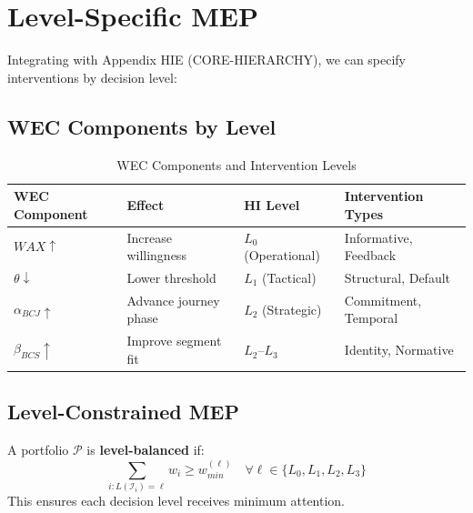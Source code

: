 \section{Level-Specific MEP}
\label{sec:mep-levels}

Integrating with Appendix HIE (CORE-HIERARCHY), we can specify interventions by
decision level:

\subsection{WEC Components by Level}

\begin{table}[htbp]
\centering
\caption{WEC Components and Intervention Levels}
\label{tab:wec-levels}
\renewcommand{\arraystretch}{1.4}
\begin{tabular}{@{}llll@{}}
\toprule
\textbf{WEC Component} & \textbf{Effect} & \textbf{HI Level} & \textbf{Intervention Types} \\
\midrule
$WAX \uparrow$ & Increase willingness & $L_0$ (Operational) & Informative, Feedback \\
$\theta \downarrow$ & Lower threshold & $L_1$ (Tactical) & Structural, Default \\
$\alpha_{BCJ} \uparrow$ & Advance journey phase & $L_2$ (Strategic) & Commitment, Temporal \\
$\beta_{BCS} \uparrow$ & Improve segment fit & $L_2$--$L_3$ & Identity, Normative \\
\bottomrule
\end{tabular}
\end{table}

\subsection{Level-Constrained MEP}

\begin{definition}
\label{def:level-balanced}
A portfolio $\mathcal{P}$ is \textbf{level-balanced} if:
\begin{equation}
\sum_{i: L(\mathcal{I}_i) = \ell} w_i \geq w_{min}^{(\ell)} \quad \forall \ell \in \{L_0, L_1, L_2, L_3\}
\end{equation}
This ensures each decision level receives minimum attention.
\end{definition}

